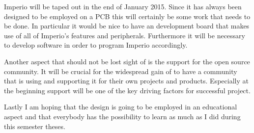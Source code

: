 Imperio will be taped out in the end of January 2015. Since it has always been designed to be employed on a PCB this will certainly be some work that needs to be done. In particular it would be nice to have an development board that makes use of all of Imperio's features and peripherals. Furthermore it will be necessary to develop software in order to program Imperio accordingly.

Another aspect that should not be lost sight of is the support for the open source community. It will be crucial for the widespread gain of \pulpino to have a community that is using and supporting it for their own projects and products. Especially at the beginning support will be one of the key driving factors for successful project.

Lastly I am hoping that the design is going to be employed in an educational aspect and that everybody has the possibility to learn as much as I did during this semester theses.
